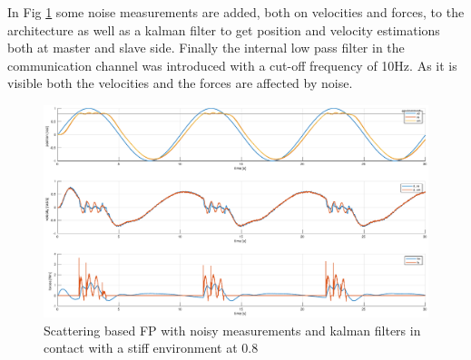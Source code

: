 \documentclass[a4paper,12pt]{article}
\begin{document}
In Fig \ref{fig:scat_pf_contact_kalman} some noise measurements are added, both on velocities and forces, to the architecture as well as a kalman filter to get position and velocity estimations both at master and slave side. Finally the internal low pass filter in the communication channel was introduced with a cut-off frequency of 10Hz. As it is visible both the velocities and the forces are affected by noise.

\begin{figure}[H]
    \begin{center}
        \hspace*{-4.5cm}
        \includegraphics[scale=0.5]{images/scatt_pf_contact_kalman.eps}
    \end{center}
    \caption{Scattering based FP with noisy measurements and kalman filters in contact with a stiff environment at 0.8}
    \label{fig:scat_pf_contact_kalman}
\end{figure}
\end{document}
